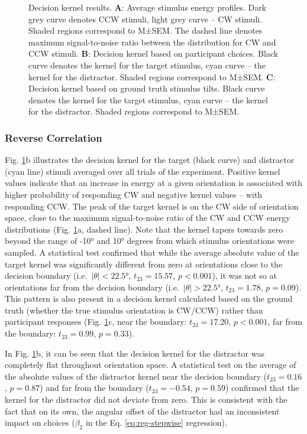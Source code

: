 \documentclass[a4paper, nobind]{templates/ociamthesis}
\begin{document}
\begin{figure}
{ }
 
 \caption[Experiment 1, Decision kernel results]{Decision kernel results. $\textbf{A:}$ Average stimulus energy profiles. Dark grey curve denotes CCW stimuli, light grey curve -- CW stimuli. Shaded regions correspond to M±SEM. The dashed line denotes maximum signal-to-noise ratio between the distribution for CW and CCW stimuli. $\textbf{B:}$ Decision kernel based on participant choices. Black curve denotes the kernel for the target stimulus, cyan curve -- the kernel for the distractor. Shaded regions correspond to M±SEM. $\textbf{C:}$ Decision kernel based on ground truth stimulus tilts. Black curve denotes the kernel for the target stimulus, cyan curve -- the kernel for the distractor. Shaded regions correspond to M±SEM.}\label{fig:distr-kernels-a}
 \end{figure}

\hypertarget{reverse-correlation-1}{%
\subsubsection{Reverse Correlation}\label{reverse-correlation-1}}

Fig. \ref{fig:distr-kernels-a}b illustrates the decision kernel for the target (black curve) and distractor (cyan line) stimuli averaged over all trials of the experiment. Positive kernel values indicate that an increase in energy at a given orientation is associated with higher probability of responding CW and negative kernel values -- with responding CCW. The peak of the target kernel is on the CW side of orientation space, close to the maximum signal-to-noise ratio of the CW and CCW energy distributions (Fig. \ref{fig:distr-kernels-a}a, dashed line). Note that the kernel tapers towards zero beyond the range of -10° and 10° degrees from which stimulus orientations were sampled. A statistical test confirmed that while the average absolute value of the target kernel was significantly different from zero at orientations close to the decision boundary (i.e.~\(|\theta|<22.5\)°, \(t_{23}=15.57\), \(p<0.001\)), it was not so at orientations far from the decision boundary (i.e.~\(|\theta|>22.5\)°, \(t_{23}=1.78\), \(p=0.09\)). This pattern is also present in a decision kernel calculated based on the ground truth (whether the true stimulus orientation is CW/CCW) rather than participant responses (Fig. \ref{fig:distr-kernels-a}c, near the boundary: \(t_{23}=17.20\), \(p<0.001\), far from the boundary: \(t_{23}=0.99\), \(p=0.33\)).

In Fig. \ref{fig:distr-kernels-a}b, it can be seen that the decision kernel for the distractor was completely flat throughout orientation space. A statistical test on the average of the absolute values of the distractor kernel near the decision boundary (\(t_{23}=0.16\), \(p=0.87\)) and far from the boundary (\(t_{23}=-0.54\), \(p=0.59\)) confirmed that the kernel for the distractor did not deviate from zero. This is consistent with the fact that on its own, the angular offset of the distractor had an inconsistent impact on choices (\(\beta_2\) in the Eq. \eqref{eq:reg-stepwise} regression).
\end{document}
